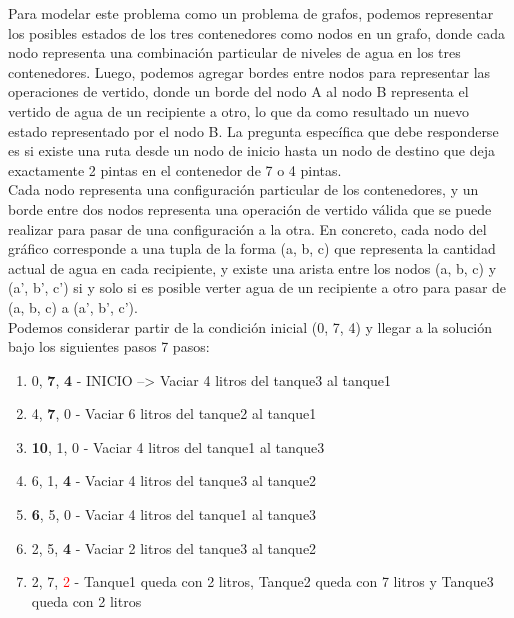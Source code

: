 \documentclass{article}
\begin{document}
Para modelar este problema como un problema de grafos, podemos representar los posibles estados de los tres contenedores como nodos en un grafo, donde cada nodo representa una combinación particular de niveles de agua en los tres contenedores. Luego, podemos agregar bordes entre nodos para representar las operaciones de vertido, donde un borde del nodo A al nodo B representa el vertido de agua de un recipiente a otro, lo que da como resultado un nuevo estado representado por el nodo B. La pregunta específica que debe responderse es si existe una ruta desde un nodo de inicio hasta un nodo de destino que deja exactamente 2 pintas en el contenedor de 7 o 4 pintas.\\

Cada nodo representa una configuración particular de los contenedores, y un borde entre dos nodos representa una operación de vertido válida que se puede realizar para pasar de una configuración a la otra. En concreto, cada nodo del gráfico corresponde a una tupla de la forma (a, b, c) que representa la cantidad actual de agua en cada recipiente, y existe una arista entre los nodos (a, b, c) y (a', b', c') si y solo si es posible verter agua de un recipiente a otro para pasar de (a, b, c) a (a', b', c').\\

Podemos considerar partir de la condición inicial (0, 7, 4) y llegar a la solución bajo los siguientes pasos 7 pasos:
\begin{enumerate}
\item 0, \textbf{7}, \textbf{4} - INICIO --> Vaciar 4 litros del tanque3 al tanque1
\item 4, \textbf{7}, 0 - Vaciar 6 litros del tanque2 al tanque1
\item \textbf{10}, 1, 0 - Vaciar 4 litros del tanque1 al tanque3
\item 6, 1, \textbf{4} - Vaciar 4 litros del tanque3 al tanque2
\item \textbf{6}, 5, 0 - Vaciar 4 litros del tanque1 al tanque3
\item 2, 5, \textbf{4} - Vaciar 2 litros del tanque3 al tanque2
\item 2, 7, \textcolor{red}{2} - Tanque1 queda con 2 litros, Tanque2 queda con 7 litros y Tanque3 queda con 2 litros
\end{enumerate}
\end{document}

